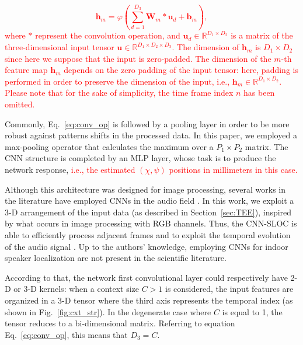 \documentclass[review]{elsarticle}
\newcommand{\secref}[1]{Section~\ref{#1}}
\newcommand{\figref}[1]{Fig.~\ref{#1}}
\let\originaleqref=\eqref
\renewcommand{\eqref}{Eq.~\originaleqref}
\begin{document}
\textcolor{red}{
\begin{equation}\label{eq:conv_op}
\mathbf{h}_{m}=\varphi	\left(\sum_{d=1}^{D_3} \mathbf{W}_{m} \ast \mathbf{u}_d + \mathbf{b}_{m} \right),
\end{equation}
where $\ast$ represent the convolution operation, and $\mathbf{u}_{d} \in \mathbb{R}^{D_1\times D_2} $ is a matrix of the three-dimensional input tensor $\mathbf{u} \in \mathbb{R}^{D_1\times D_2 \times D_3}$. The dimension of $\mathbf{h}_{m}$ is $ D_1\times D_2$ since here we suppose that the input is zero-padded. The dimension of the $m$-th feature map $\mathbf{h}_{m}$ depends on the zero padding of the input tensor: here, padding is performed in order to preserve the dimension of the input, i.e., $\mathbf{h}_{m} \in \mathbb{R}^{D_1\times D_2}$. Please note that for the sake of simplicity, the time frame index $n$ has been omitted.}  %

Commonly, \eqref{eq:conv_op} is followed by a pooling layer in order to be more robust against patterns shifts in the processed data. In this paper, we employed a max-pooling operator that calculates the maximum over a $P_1 \times P_2 $ matrix. The CNN structure is completed by an MLP layer, whose task is to produce the network response, \textcolor{red}{i.e., the estimated $\left ( \chi,\psi \right ) $ positions in millimeters in this case.}

Although this architecture was designed for image processing, several works in the literature have employed CNNs in the audio field \cite{thomas2014analyzing,mcloughlin2015low}. In this work, we exploit a 3-D arrangement of the input data (as described in \secref{sec:TEE}), %
inspired by what occurs in image processing with RGB channels. Thus, the CNN-SLOC is able to efficiently process adjacent frames and to exploit the temporal evolution of the audio signal \cite{wirn2016-vad}. Up to the authors' knowledge, employing CNNs for indoor speaker localization are not present in the scientific literature.

According to that, the network first convolutional layer could respectively have 2-D or 3-D kernels: when a context size $C > 1$ is considered, the input features are organized in a 3-D tensor where the third axis represents the temporal index (as shown in \figref{fig:cxt_str}). In the degenerate case where $C$ is equal to 1, the tensor reduces to a bi-dimensional matrix. Referring to equation \eqref{eq:conv_op}, this means that $D_3 = C$.
\end{document}
